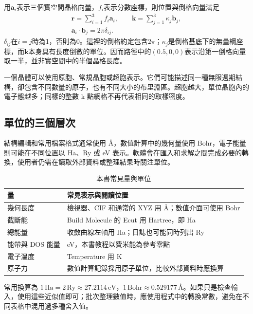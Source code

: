用$\mathbf a_i$表示三個實空間晶格向量，$f_i$表示分數座標，則位置與倒格向量滿足
\begin{equation}
  \begin{gathered}
  \mathbf r=\sum_{i=1}^{3}f_i\mathbf a_i,
  \qquad \mathbf k=\sum_{j=1}^{3}\kappa_j\mathbf b_j,\\
  \mathbf a_i\!\cdot\!\mathbf b_j=2\pi\delta_{ij}.
  \end{gathered}
  \label{eq:reciprocal-convention}
\end{equation}
$\delta_{ij}$在$i=j$時為1，否則為0。這裡的倒格約定包含$2\pi$；$\kappa_j$是倒格基底下的無量綱座標，而$\mathbf k$本身具有長度倒數的單位。因而路徑中的$(0.5,0,0)$表示沿第一倒格向量取一半，並非實空間中的半個晶格長度。

一個晶體可以使用原胞、常規晶胞或超胞表示。它們可能描述同一種無限週期結構，卻包含不同數量的原子，也有不同大小的布里淵區。超胞越大，單位晶胞內的電子態越多；同樣的整數 k 點網格不再代表相同的取樣密度。

\subsection{單位的三個層次}

結構編輯和常用檔案格式通常使用 Å，數值計算中的幾何量使用 Bohr，電子能量則可能在不同位置以 Ha、Ry 或 eV 表示。軟體會在匯入和求解之間完成必要的轉換，使用者仍需在讀取外部資料或整理結果時關注單位。

\begin{table}[htbp]
\centering
\caption{本書常見量與單位}
\begin{tabularx}{\linewidth}{lX}
\toprule
量 & 常見表示與閱讀位置\\
\midrule
幾何長度 & 檢視器、CIF 和通常的 XYZ 用 Å；數值介面可使用 Bohr\\
截斷能 & Build Molecule 的 Ecut 用 Hartree，即 Ha\\
總能量 & 收斂曲線左軸用 Ha；日誌也可能同時列出 Ry\\
能帶與 DOS 能量 & eV，本書教程以費米能為參考零點\\
電子溫度 & Temperature 用 K\\
原子力 & 數值計算記錄採用原子單位，比較外部資料時應換算\\
\bottomrule
\end{tabularx}
\end{table}

常用換算為 $1\,\mathrm{Ha}=2\,\mathrm{Ry}\approx27.2114\,\mathrm{eV}$，$1\,\mathrm{Bohr}\approx0.529177\,\text{Å}$。如果只是檢查輸入，使用這些近似值即可；批次整理數值時，應使用程式中的轉換常數，避免在不同表格中混用過多種舍入值。

